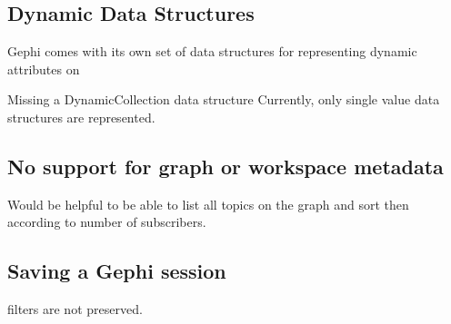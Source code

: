 \subsection{Dynamic Data Structures}

Gephi comes with its own set of data structures for representing
dynamic attributes on

Missing a DynamicCollection data structure Currently, only single value
data structures are represented.

\subsection{No support for graph or workspace metadata}
Would be helpful to be able to list all topics on the graph and sort
then according to number of subscribers.

\subsection{Saving a Gephi session}
filters are not preserved.

